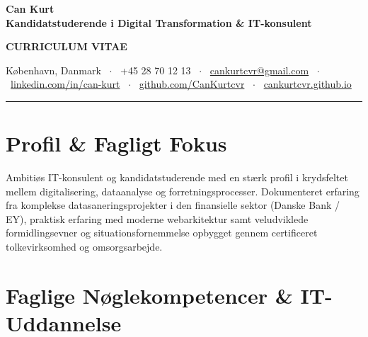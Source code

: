 \documentclass[9.5pt,a4paper]{article}
\begin{document}
\begin{minipage}[t]{0.70\textwidth}
    {\fontsize{22}{26}\selectfont\textbf{\color{primary}Can Kurt}} \\[2pt]
    {\fontsize{10}{13}\selectfont\textbf{\color{accent}Kandidatstuderende i Digital Transformation \& IT-konsulent}}
\end{minipage}
\hfill
\begin{minipage}[t]{0.28\textwidth}
    \raggedleft
    {\fontsize{8.5}{11}\selectfont\color{mutedgray}\textbf{CURRICULUM VITAE}}
\end{minipage}

\vspace{6pt}
{\fontsize{8.5}{11}\selectfont\color{darkslate}
København, Danmark \ $\cdot$ \ 
+45 28 70 12 13 \ $\cdot$ \ 
\href{mailto:cankurtcvr@gmail.com}{cankurtcvr@gmail.com} \ $\cdot$ \ 
\href{https://linkedin.com/in/can-kurt}{linkedin.com/in/can-kurt} \ $\cdot$ \ 
\href{https://github.com/CanKurtcvr}{github.com/CanKurtcvr} \ $\cdot$ \ 
\href{https://cankurtcvr.github.io}{cankurtcvr.github.io}
}

\vspace{4pt}
{\color{primary}\rule{\linewidth}{1.5pt}}
\vspace{2pt}

\section{Profil \& Fagligt Fokus}
{\fontsize{9}{12.5}\selectfont\color{darkslate}
Ambitiøs IT-konsulent og kandidatstuderende med en stærk profil i krydsfeltet mellem digitalisering, dataanalyse og forretningsprocesser. Dokumenteret erfaring fra komplekse datasaneringsprojekter i den finansielle sektor (Danske Bank / EY), praktisk erfaring med moderne webarkitektur samt veludviklede formidlingsevner og situationsfornemmelse opbygget gennem certificeret tolkevirksomhed og omsorgsarbejde.
}

\section{Faglige Nøglekompetencer \& IT-Uddannelse}
\end{document}
